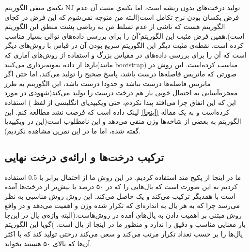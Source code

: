 \documentclass[11pt]{article}
\begin{document}
نکته‌ی منفی الگوریتم NJ تولید درخت‌های بدون ریشه است، اما نکته‌ي مثبت آن عدم فرض یکسان بودن نرخ تکامل است(البته من متوجه نمی‌شوم که این فرض در کجای الگوریتم هست که ناشی از عدم تسلط من به ریاضی پشت منطق این الگوریتم است).همین فرض مثبت این الگوریتم ٔآن را برای بررسی داده‌‌های توالی بسیار مناسب کرده است. نقطه‌ی مثبت دیگر این الگوریتم سریع بودن آن در قیاس با روش‌های دیگر است که آن را برای بررسی داده‌های در مقیاس بزرگ و استفاده از روش‌های آماری که بارها از داده نمونه‌برداری می‌کنند(مانند bootstrap) مناسب کرده‌است. این روش در صورتی که ماتریس فاصله‌ها درست باشد، پاسخ صحیح را تولید می‌کند، اما حتی اگر ماتریس فاصله‌ها درست نباشد و حدودا درست باشد، این الگوریتم به طرز معجزه‌آسایی به احتمال خوبی باز هم درخت درست را تولید می‌کند(شهودی در مورد این که این اتفاق چرا می‌افتد پیدا نکردم، حتی ویکیپدیای انگلیسی از لفظ
) استفاده کرده‌‌است و به یک مقاله‌
\href{https://arxiv.org/abs/cs/0602041}{(اینجا)}
 لینک داده است که فرصت نشد مطالعه کنم.  این الگوریتم به بعضی از شاخه‌ها وزن منفی می‌دهد و این نامطلوب است(این در ویکیپدیا گفته شده، اما ما در این تمرین مشاهده نکردیم).
 \subsection{ترکیب درخت‌ها و ارائه‌ی درخت نهایی}
 ما در اینجا از پکیج
 متد
 استفاده کردیم. در این روش ما از احتمال برابر با 0.5 استفاده کردیم به این صورت است که یا‌ل‌‌هایی را که در ۵۰ درصد یا بیش‌تر از درخت‌ها آمده است با همدیگر ترکیب می‌‌کند و یک 
 حاصل می‌کند. این روش روش مناسبی به نظر می‌رسد چرا که به هر یال به اندازه‌ای که تکرار شده وزن و اهمیت می‌دهد و در واقع روش مبتنی بر اهمیت دادن به یال‌های آمده در روش‌هاست.(البته واژه‌ی یال در این‌جا بار معنایی مناسب و دقیق را ندارد و منظور ما در اینجا از یال 
 است.
  )گویا این الگوریتم یال‌ها را بر حسب تعداد تکرار مرتب می‌کند و سعی می‌کند درختی تولید کند که با اکثر آن‌ها که بالای ۵۰ هستند بخواند.
\end{document}
